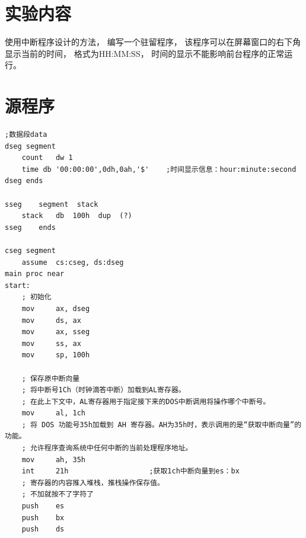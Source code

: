 \documentclass[12pt]{article}
\begin{document}
\section{实验内容}
使用中断程序设计的方法，
编写一个驻留程序，
该程序可以在屏幕窗口的右下角显示当前的时间，
格式为HH:MM:SS，
时间的显示不能影响前台程序的正常运行。

\section{源程序}
    \begin{lstlisting}[caption={汇编源代码}, label=lst:asm2]
;数据段data
dseg segment
    count   dw 1
    time db '00:00:00',0dh,0ah,'$'    ;时间显示信息：hour:minute:second
dseg ends

sseg    segment  stack
    stack   db  100h  dup  (?)
sseg    ends

cseg segment
    assume  cs:cseg, ds:dseg
main proc near
start:
    ; 初始化
    mov     ax, dseg
    mov     ds, ax
    mov     ax, sseg
    mov     ss, ax
    mov     sp, 100h

    ; 保存原中断向量
    ; 将中断号1Ch（时钟滴答中断）加载到AL寄存器。
    ; 在此上下文中，AL寄存器用于指定接下来的DOS中断调用将操作哪个中断号。
    mov     al, 1ch
    ; 将 DOS 功能号35h加载到 AH 寄存器。AH为35h时，表示调用的是“获取中断向量”的功能。
    ; 允许程序查询系统中任何中断的当前处理程序地址。
    mov     ah, 35h
    int     21h                   ;获取1ch中断向量到es：bx
    ; 寄存器的内容推入堆栈，推栈操作保存值。
    ; 不加就按不了字符了
    push    es
    push    bx
    push    ds
    

\end{lstlisting}
\end{document}

